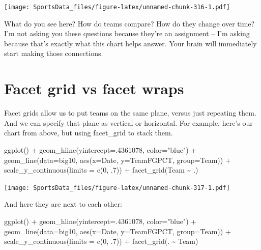 \documentclass[
]{book}
\newenvironment{Shaded}{\begin{snugshade}}{\end{snugshade}}
\newcommand{\AttributeTok}[1]{\textcolor[rgb]{0.77,0.63,0.00}{#1}}
\newcommand{\DecValTok}[1]{\textcolor[rgb]{0.00,0.00,0.81}{#1}}
\newcommand{\FunctionTok}[1]{\textcolor[rgb]{0.00,0.00,0.00}{#1}}
\newcommand{\NormalTok}[1]{#1}
\newcommand{\SpecialCharTok}[1]{\textcolor[rgb]{0.00,0.00,0.00}{#1}}
\newcommand{\StringTok}[1]{\textcolor[rgb]{0.31,0.60,0.02}{#1}}
\begin{document}
\texttt{[image: SportsData\_files/figure-latex/unnamed-chunk-316-1.pdf]}

What do you see here? How do teams compare? How do they change over time? I'm not asking you these questions because they're an assignment -- I'm asking because that's exactly what this chart helps answer. Your brain will immediately start making those connections.

\hypertarget{facet-grid-vs-facet-wraps}{%
\section{Facet grid vs facet wraps}\label{facet-grid-vs-facet-wraps}}

Facet grids allow us to put teams on the same plane, versus just repeating them. And we can specify that plane as vertical or horizontal. For example, here's our chart from above, but using facet\_grid to stack them.

\begin{Shaded}
\begin{Highlighting}[]
\FunctionTok{ggplot}\NormalTok{() }\SpecialCharTok{+} 
  \FunctionTok{geom\_hline}\NormalTok{(}\AttributeTok{yintercept=}\NormalTok{.}\DecValTok{4361078}\NormalTok{, }\AttributeTok{color=}\StringTok{"blue"}\NormalTok{) }\SpecialCharTok{+} 
  \FunctionTok{geom\_line}\NormalTok{(}\AttributeTok{data=}\NormalTok{big10, }\FunctionTok{aes}\NormalTok{(}\AttributeTok{x=}\NormalTok{Date, }\AttributeTok{y=}\NormalTok{TeamFGPCT, }\AttributeTok{group=}\NormalTok{Team)) }\SpecialCharTok{+} 
  \FunctionTok{scale\_y\_continuous}\NormalTok{(}\AttributeTok{limits =} \FunctionTok{c}\NormalTok{(}\DecValTok{0}\NormalTok{, .}\DecValTok{7}\NormalTok{)) }\SpecialCharTok{+} 
  \FunctionTok{facet\_grid}\NormalTok{(Team }\SpecialCharTok{\textasciitilde{}}\NormalTok{ .)}
\end{Highlighting}
\end{Shaded}

\texttt{[image: SportsData\_files/figure-latex/unnamed-chunk-317-1.pdf]}

And here they are next to each other:

\begin{Shaded}
\begin{Highlighting}[]
\FunctionTok{ggplot}\NormalTok{() }\SpecialCharTok{+} 
  \FunctionTok{geom\_hline}\NormalTok{(}\AttributeTok{yintercept=}\NormalTok{.}\DecValTok{4361078}\NormalTok{, }\AttributeTok{color=}\StringTok{"blue"}\NormalTok{) }\SpecialCharTok{+} 
  \FunctionTok{geom\_line}\NormalTok{(}\AttributeTok{data=}\NormalTok{big10, }\FunctionTok{aes}\NormalTok{(}\AttributeTok{x=}\NormalTok{Date, }\AttributeTok{y=}\NormalTok{TeamFGPCT, }\AttributeTok{group=}\NormalTok{Team)) }\SpecialCharTok{+} 
  \FunctionTok{scale\_y\_continuous}\NormalTok{(}\AttributeTok{limits =} \FunctionTok{c}\NormalTok{(}\DecValTok{0}\NormalTok{, .}\DecValTok{7}\NormalTok{)) }\SpecialCharTok{+} 
  \FunctionTok{facet\_grid}\NormalTok{(. }\SpecialCharTok{\textasciitilde{}}\NormalTok{ Team)}
\end{Highlighting}
\end{Shaded}
\end{document}
